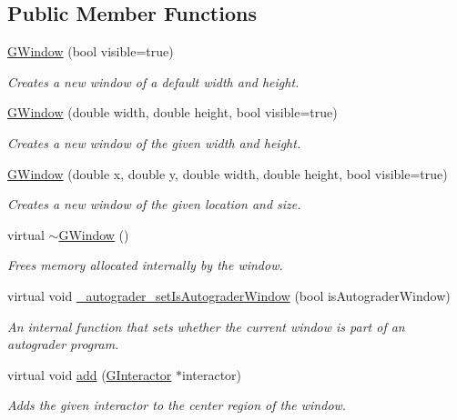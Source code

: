 \subsection*{Public Member Functions}
\begin{DoxyCompactItemize}
\item 
\mbox{\hyperlink{classGWindow_a7fdeab875fb526a49423085ac13ac9f2}{G\+Window}} (bool visible=true)
\begin{DoxyCompactList}\small\item\em Creates a new window of a default width and height. \end{DoxyCompactList}\item 
\mbox{\hyperlink{classGWindow_acb88532777f61b140aa8245ed1d9887e}{G\+Window}} (double width, double height, bool visible=true)
\begin{DoxyCompactList}\small\item\em Creates a new window of the given width and height. \end{DoxyCompactList}\item 
\mbox{\hyperlink{classGWindow_ac66942f456baa6c43ecd0ed60138fe36}{G\+Window}} (double x, double y, double width, double height, bool visible=true)
\begin{DoxyCompactList}\small\item\em Creates a new window of the given location and size. \end{DoxyCompactList}\item 
virtual \mbox{\hyperlink{classGWindow_a2323cfadb32625a10de927b7f1fb92cb}{$\sim$\+G\+Window}} ()
\begin{DoxyCompactList}\small\item\em Frees memory allocated internally by the window. \end{DoxyCompactList}\item 
virtual void \mbox{\hyperlink{classGWindow_a458811bab688db3875a6806b3ba4d938}{\+\_\+autograder\+\_\+set\+Is\+Autograder\+Window}} (bool is\+Autograder\+Window)
\begin{DoxyCompactList}\small\item\em An internal function that sets whether the current window is part of an autograder program. \end{DoxyCompactList}\item 
virtual void \mbox{\hyperlink{classGWindow_a6f99b7c841256dbdc5acaafbbca4e685}{add}} (\mbox{\hyperlink{classGInteractor}{G\+Interactor}} $\ast$interactor)
\begin{DoxyCompactList}\small\item\em Adds the given interactor to the center region of the window. \end{DoxyCompactList}\item 

\end{DoxyCompactItemize}
